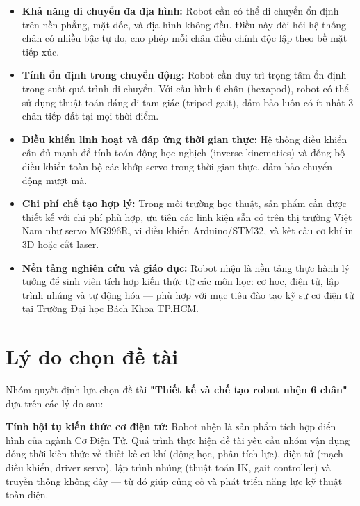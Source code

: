 \begin{itemize}
    \item \textbf{Khả năng di chuyển đa địa hình:} Robot cần có thể di chuyển ổn định trên nền phẳng, mặt dốc, và địa hình không đều. Điều này đòi hỏi hệ thống chân có nhiều bậc tự do, cho phép mỗi chân điều chỉnh độc lập theo bề mặt tiếp xúc.

    \item \textbf{Tính ổn định trong chuyển động:} Robot cần duy trì trọng tâm ổn định trong suốt quá trình di chuyển. Với cấu hình 6 chân (hexapod), robot có thể sử dụng thuật toán dáng đi tam giác (tripod gait), đảm bảo luôn có ít nhất 3 chân tiếp đất tại mọi thời điểm.

    \item \textbf{Điều khiển linh hoạt và đáp ứng thời gian thực:} Hệ thống điều khiển cần đủ mạnh để tính toán động học nghịch (inverse kinematics) và đồng bộ điều khiển toàn bộ các khớp servo trong thời gian thực, đảm bảo chuyển động mượt mà.

    \item \textbf{Chi phí chế tạo hợp lý:} Trong môi trường học thuật, sản phẩm cần được thiết kế với chi phí phù hợp, ưu tiên các linh kiện sẵn có trên thị trường Việt Nam như servo MG996R, vi điều khiển Arduino/STM32, và kết cấu cơ khí in 3D hoặc cắt laser.

    \item \textbf{Nền tảng nghiên cứu và giáo dục:} Robot nhện là nền tảng thực hành lý tưởng để sinh viên tích hợp kiến thức từ các môn học: cơ học, điện tử, lập trình nhúng và tự động hóa — phù hợp với mục tiêu đào tạo kỹ sư cơ điện tử tại Trường Đại học Bách Khoa TP.HCM.
\end{itemize}

\section{Lý do chọn đề tài}

\hspace{0.5cm} Nhóm quyết định lựa chọn đề tài \textbf{"Thiết kế và chế tạo robot nhện 6 chân"} dựa trên các lý do sau:

\textbf{Tính hội tụ kiến thức cơ điện tử:} Robot nhện là sản phẩm tích hợp điển hình của ngành Cơ Điện Tử. Quá trình thực hiện đề tài yêu cầu nhóm vận dụng đồng thời kiến thức về thiết kế cơ khí (động học, phân tích lực), điện tử (mạch điều khiển, driver servo), lập trình nhúng (thuật toán IK, gait controller) và truyền thông không dây — từ đó giúp củng cố và phát triển năng lực kỹ thuật toàn diện.

